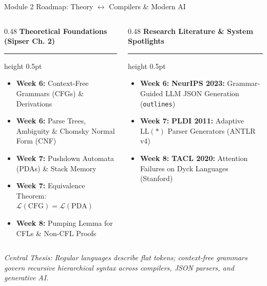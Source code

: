 \documentclass[aspectratio=169, 10pt]{beamer}
\newcommand{\colheader}[1]{%
  {\noindent\footnotesize\bfseries\color{gimpanavy}#1}%
  \vspace{0.03cm}%
  {\color{gimpanavy!30}\hrule height 0.5pt}%
  \vspace{0.08cm}%
}
\begin{document}
\begin{frame}{Module 2 Roadmap: Theory $\leftrightarrow$ Compilers \& Modern AI}
  \begin{columns}[T]
    \begin{column}{0.48\textwidth}
      \colheader{Theoretical Foundations (Sipser Ch. 2)}
      \begin{tcolorbox}[conceptcard]
        \begin{itemize}\setlength{\itemsep}{3.5pt}\footnotesize
          \item \textbf{Week 6:} Context-Free Grammars (CFGs) \& Derivations
          \item \textbf{Week 6:} Parse Trees, Ambiguity \& Chomsky Normal Form (CNF)
          \item \textbf{Week 7:} Pushdown Automata (PDAs) \& Stack Memory
          \item \textbf{Week 7:} Equivalence Theorem: $\mathcal{L}(\text{CFG}) = \mathcal{L}(\text{PDA})$
          \item \textbf{Week 8:} Pumping Lemma for CFLs \& Non-CFL Proofs
        \end{itemize}
      \end{tcolorbox}
    \end{column}

    \hfill

    \begin{column}{0.48\textwidth}
      \colheader{Research Literature \& System Spotlights}
      \begin{tcolorbox}[spotlightcard]
        \begin{itemize}\setlength{\itemsep}{3.5pt}\footnotesize
          \item \textbf{Week 6:} \textbf{NeurIPS 2023:} Grammar-Guided LLM JSON Generation (\texttt{outlines})
          \item \textbf{Week 7:} \textbf{PLDI 2011:} Adaptive $\text{LL}(*)$ Parser Generators (ANTLR v4)
          \item \textbf{Week 8:} \textbf{TACL 2020:} Attention Failures on Dyck Languages (Stanford)
        \end{itemize}
      \end{tcolorbox}
    \end{column}
  \end{columns}
  
  \vspace{0.20cm}
  \begin{center}
    {\footnotesize\color{gimpaslate}\textit{Central Thesis: Regular languages describe flat tokens; context-free grammars govern recursive hierarchical syntax across compilers, JSON parsers, and generative AI.}}
  \end{center}
\end{frame}
\end{document}
